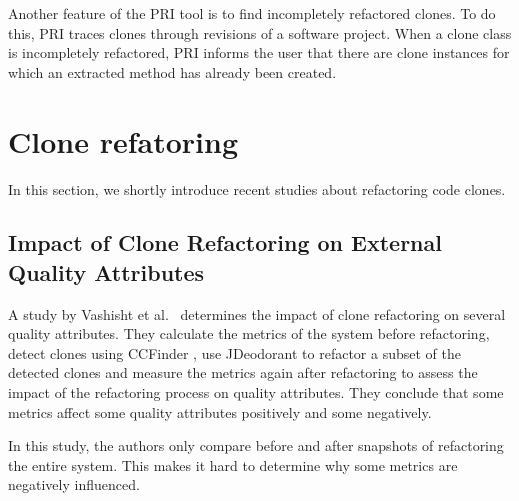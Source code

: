 Another feature of the PRI tool is to find incompletely refactored clones. To do this, PRI traces clones through revisions of a software project. When a clone class is incompletely refactored, PRI informs the user that there are clone instances for which an extracted method has already been created.

\section{Clone refatoring}
In this section, we shortly introduce recent studies about refactoring code clones.

\subsection{Impact of Clone Refactoring on External Quality Attributes}
A study by Vashisht et al.~\cite{vashisht2018impact} determines the impact of clone refactoring on several quality attributes. They calculate the metrics of the system before refactoring, detect clones using CCFinder \cite{kamiya2002ccfinder}, use JDeodorant to refactor a subset of the detected clones \cite{mazinanian2016jdeodorant} and measure the metrics again after refactoring to assess the impact of the refactoring process on quality attributes. They conclude that some metrics affect some quality attributes positively and some negatively.

In this study, the authors only compare before and after snapshots of refactoring the entire system. This makes it hard to determine why some metrics are negatively influenced.
